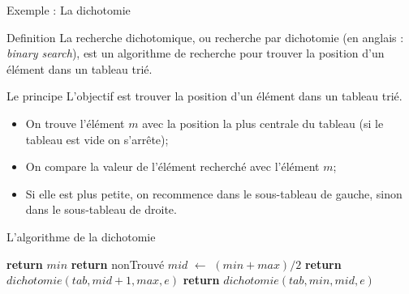 \documentclass[10pt,xcolor=dvipsnames]{beamer}
\newcommand*\Let[2]{\State #1 $\gets$ #2}
\begin{document}
  
\begin{frame}{Exemple : La dichotomie}
    \begin{exampleblock}{Definition}
    La recherche dichotomique, ou recherche par dichotomie (en anglais : \textit{binary search}), est un algorithme de recherche pour trouver la position d'un élément dans un tableau trié.
    \end{exampleblock}
\begin{alertblock}{Le principe}
L'objectif est trouver la position d'un élément dans un tableau trié.
\begin{itemize}
    \item On trouve l'élément $m$ avec la position la plus centrale du tableau (si le tableau est vide on s'arrête);
    \item On compare la valeur de l'élément recherché avec l'élément $m$;
    \item Si elle est plus petite, on recommence dans le sous-tableau de gauche, sinon dans le sous-tableau de droite.
\end{itemize}
\end{alertblock}

\end{frame}

\begin{frame}{L'algorithme de la dichotomie}
    
\begin{tcolorbox}
  \begin{algorithmic}[1]
        
                \State \textbf{return} $min$
        \Else
            \State \textbf{return} nonTrouvé
            \EndIf
        \EndIf
    \Let{$mid$}{$( min + max ) / 2$}
        \State \textbf{return} $dichotomie(tab, mid+1, max, e)$
    \Else
        \State \textbf{return} $dichotomie(tab, min, mid, e)$
    \EndIf
    \EndFunction
  \end{algorithmic}
\end{tcolorbox}


\end{frame}
\end{document}
